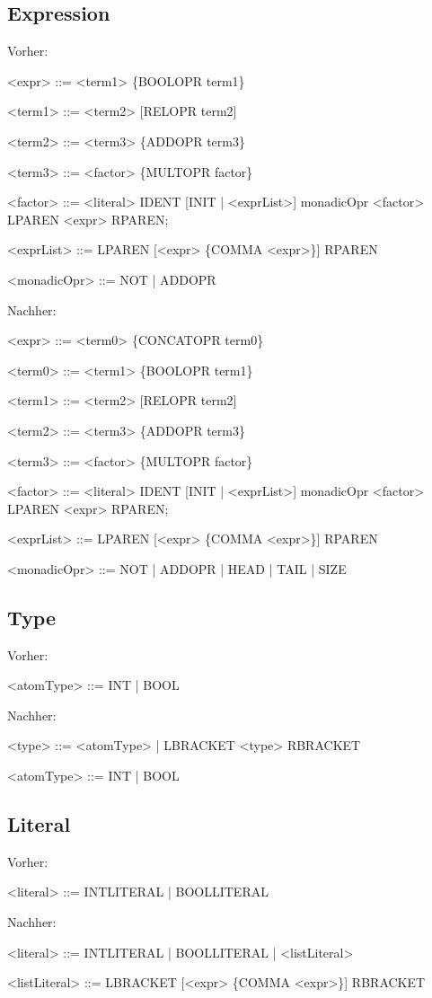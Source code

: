 \documentclass[a4paper,notitlepage,oneside]{scrartcl}
\begin{document}
\subsection{Expression}
Vorher: 
\begin{grammar}
<expr> ::= <term1> \{BOOLOPR term1\}

<term1> ::= <term2> [RELOPR term2]

<term2> ::= <term3> \{ADDOPR term3\}

<term3> ::= <factor> \{MULTOPR factor\}

<factor> ::= <literal>
		\alt IDENT [INIT | <exprList>]
		\alt monadicOpr <factor>
		\alt LPAREN <expr> RPAREN;
		
<exprList> ::= LPAREN [<expr> \{COMMA <expr>\}] RPAREN

<monadicOpr> ::= NOT | ADDOPR
\end{grammar}
Nachher:
\begin{grammar}
<expr> ::= <term0> \{CONCATOPR term0\}

<term0> ::= <term1> \{BOOLOPR term1\}

<term1> ::= <term2> [RELOPR term2]

<term2> ::= <term3> \{ADDOPR term3\}

<term3> ::= <factor> \{MULTOPR factor\}

<factor> ::= <literal>
		\alt IDENT [INIT | <exprList>]
		\alt monadicOpr <factor>
		\alt LPAREN <expr> RPAREN;
		
<exprList> ::= LPAREN [<expr> \{COMMA <expr>\}] RPAREN

<monadicOpr> ::= NOT | ADDOPR | HEAD | TAIL | SIZE

\end{grammar}

\newpage


\subsection{Type}
Vorher:
\begin{grammar}
<atomType> ::= INT | BOOL
\end{grammar}
Nachher:
\begin{grammar}
<type> ::=  <atomType> | LBRACKET <type> RBRACKET

<atomType> ::= INT | BOOL
\end{grammar}

\subsection{Literal}
Vorher:
\begin{grammar}
<literal> ::= INTLITERAL | BOOLLITERAL
\end{grammar}
Nachher:
\begin{grammar}
<literal> ::= INTLITERAL | BOOLLITERAL | <listLiteral>

<listLiteral> ::= LBRACKET [<expr> \{COMMA <expr>\}] RBRACKET
\end{grammar}
\end{document}
